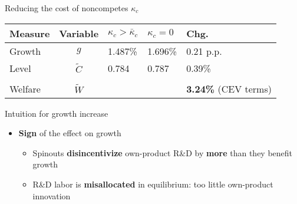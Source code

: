 \documentclass[english,usenames,dvipsnames]{beamer}
\begin{document}
\begin{frame}{Reducing the cost of noncompetes $\kappa_c$}\label{reducing_kappa_c_table}
	\begin{table}
		\centering
		\small
		\begin{tabular}{lclll}
			\toprule \toprule
			Measure & Variable & $\kappa_c > \bar{\kappa}_c$ & $\kappa_c = 0$ & Chg. \tabularnewline
			\midrule
			Growth & $g$ & 1.487\% & 1.696\% & 0.21 p.p. \tabularnewline
			Level & $\tilde{C}$  & 0.784 &  0.787 & 0.39\% \tabularnewline 
			\tabularnewline
			Welfare & $\tilde{W}$  &  & & \alert{\textbf{3.24\%}} (CEV terms)  \tabularnewline
			\bottomrule
		\end{tabular}
	\end{table}
	\hyperlink{decomposition_growth_increase}{}
	\hyperlink{plots:reducing_kappa_c1}{}
	\hyperlink{plots:reducing_kappa_c2}{}
	\hyperlink{robustness_to_moments}{} \hyperlink{robustness_to_parameters}{}
	\hyperlink{reducing_kappa_c_table:entry_costs_as_transfers}{}
	\hyperlink{reducing_kappa_c_table:incumbentDRS}{}
	\hyperlink{efficiency}{}
\end{frame}

\begin{frame}{Intuition for growth increase}\label{reducing_kappa_c_intuition_overview}
	\begin{itemize}
		\item<+-> \alert{\textbf{Sign}} of the effect on growth
		\begin{itemize}
			\item <+-> Spinouts \alert{\textbf{disincentivize}} own-product R\&D by \alert{\textbf{more}} than they benefit growth
			\item <+-> R\&D labor is \alert{\textbf{misallocated}} in equilibrium: too little own-product innovation
		\end{itemize}
	\end{itemize}
\end{frame}
\end{document}
